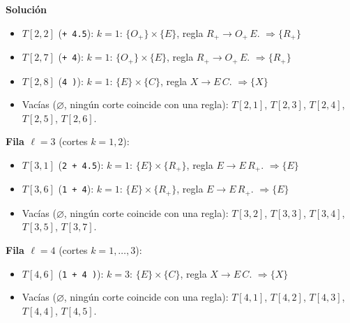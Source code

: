 \documentclass[12pt, letterpaper]{article}
\newenvironment{solucion}{\par\medskip\noindent\textbf{\large Solución}\par\smallskip}{\par\bigskip}
\begin{document}
\begin{enumerate}
\begin{solucion}
  \begin{itemize}[leftmargin=*,itemsep=0pt]
    
  \item $T[2,2]$ (\texttt{+ 4.5}): $k=1$: $\{O_{+}\} \times \{E\}$, regla $R_{+} \to O_{+}\,E$. $\Rightarrow \{R_{+}\}$
    
  \item $T[2,7]$ (\texttt{+ 4}): $k=1$: $\{O_{+}\} \times \{E\}$, regla $R_{+} \to O_{+}\,E$. $\Rightarrow \{R_{+}\}$
    
  \item $T[2,8]$ (\texttt{4 )}): $k=1$: $\{E\} \times \{C\}$, regla $X \to E\,C$. $\Rightarrow \{X\}$
    
  \item Vacías ($\varnothing$, ningún corte coincide con una regla): $T[2,1]$, $T[2,3]$, $T[2,4]$, $T[2,5]$, $T[2,6]$.
    
  \end{itemize}
  
  \textbf{Fila $\ell=3$} (cortes $k=1,2$):
  
  \begin{itemize}[leftmargin=*,itemsep=0pt]
    
  \item $T[3,1]$ (\texttt{2 + 4.5}): $k=1$: $\{E\} \times \{R_{+}\}$, regla $E \to E\,R_{+}$. $\Rightarrow \{E\}$
    
  \item $T[3,6]$ (\texttt{1 + 4}): $k=1$: $\{E\} \times \{R_{+}\}$, regla $E \to E\,R_{+}$. $\Rightarrow \{E\}$
    
  \item Vacías ($\varnothing$, ningún corte coincide con una regla): $T[3,2]$, $T[3,3]$, $T[3,4]$, $T[3,5]$, $T[3,7]$.
    
  \end{itemize}
  
  \textbf{Fila $\ell=4$} (cortes $k=1,\dots,3$):
  
  \begin{itemize}[leftmargin=*,itemsep=0pt]
    
  \item $T[4,6]$ (\texttt{1 + 4 )}): $k=3$: $\{E\} \times \{C\}$, regla $X \to E\,C$. $\Rightarrow \{X\}$
    
  \item Vacías ($\varnothing$, ningún corte coincide con una regla): $T[4,1]$, $T[4,2]$, $T[4,3]$, $T[4,4]$, $T[4,5]$.
    
  \end{itemize}
  

\end{solucion}
\end{enumerate}
\end{document}
